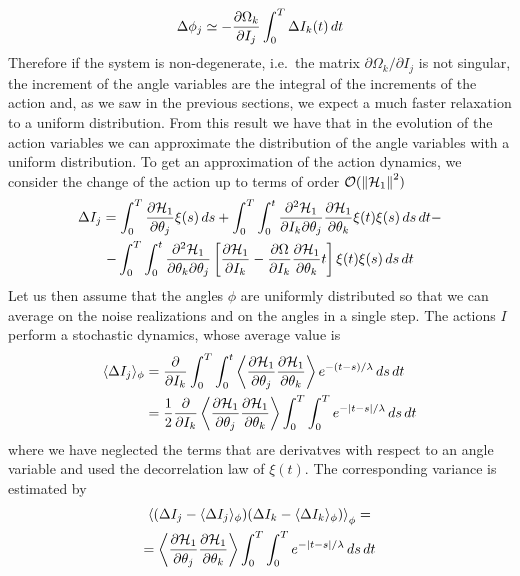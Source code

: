 \begin{equation}
	\Delta \phi_j \simeq -\pdv{\Omega_k}{I_j}\int_0^T\Delta I_k(t)\,dt
\end{equation}
Therefore if the system is non-degenerate, i.e.\ the matrix \(\partial\Omega_k/\partial I_j\) is not singular, the increment of the angle variables are the integral of the increments of the action and, as we saw in the previous sections, we expect a much faster relaxation to a uniform distribution. From this result we have that in the evolution of the action variables we can approximate the distribution of the angle variables with a uniform distribution. To get an approximation of the action dynamics, we consider the change of the action up to terms of order \(\mathcal{O}(\norm{\mathcal{H}_1}^2)\)
\begin{multline}
	\Delta I_j = \int_0^T \pdv{\mathcal{H}_1}{\theta_j}\xi(s)\,ds + \int_0^T\int_0^t \pdv{\mathcal{H}_1}{I_k}{\theta_j}\pdv{\mathcal{H}_1}{\theta_k}\xi(t)\xi(s)\,ds\,dt - \\
	- \int_0^T\int_0^t\pdv{\mathcal{H}_1}{\theta_k}{\theta_j}\left[\pdv{\mathcal{H}_1}{I_k}-\pdv{\Omega}{I_k}\pdv{\mathcal{H}_1}{\theta_k}t\right]\xi(t)\xi(s)\,ds\,dt
\end{multline}
Let us then assume that the angles \(\phi\) are uniformly distributed so that we can average on the noise realizations and on the angles in a single step. The actions \(I\) perform a stochastic dynamics, whose average value is
\begin{equation}
	\begin{aligned}
		\langle\Delta I_j\rangle_\phi &= \pdv{}{I_k}\int_0^T\int_0^t \left\langle\pdv{\mathcal{H}_1}{\theta_j}\pdv{\mathcal{H}_1}{\theta_k}\right\rangle e^{-(t-s)/\lambda}\,ds\,dt\\
		&= \frac{1}{2}\pdv{}{I_k}\left\langle\pdv{\mathcal{H}_1}{\theta_j}\pdv{\mathcal{H}_1}{\theta_k}\right\rangle\int_0^T\int_0^T e^{-\abs{t-s}/\lambda}\,ds\,dt
	\end{aligned}
\end{equation}
where we have neglected the terms that are derivatves with respect to an angle variable and used the decorrelation law of \(\xi(t)\). The corresponding variance is estimated by %
\begin{multline}
	\left\langle(\Delta I_j - \langle\Delta I_j\rangle_\phi)(\Delta I_k - \langle\Delta I_k\rangle_\phi)\right\rangle_\phi =\\
	= \left\langle\pdv{\mathcal{H}_1}{\theta_j}\pdv{\mathcal{H}_1}{\theta_k}\right\rangle\int_0^T\int_0^T e^{-\abs{t-s}/\lambda}\,ds\,dt
\end{multline}
